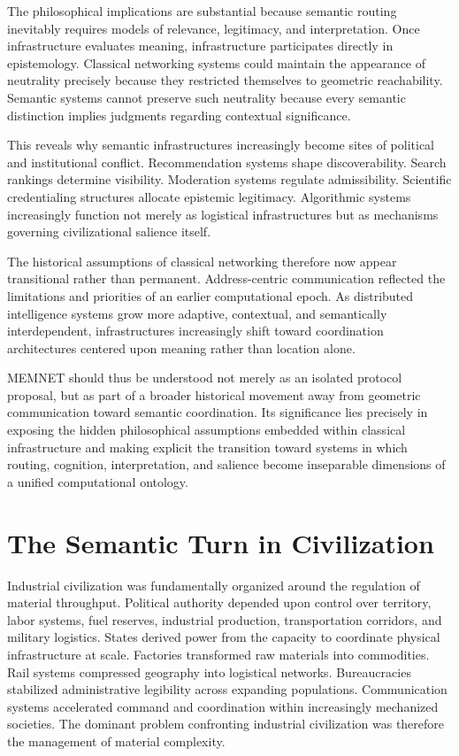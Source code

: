 \documentclass[11pt,a4paper]{article}
\begin{document}
The philosophical implications are substantial because semantic routing inevitably requires models of relevance, legitimacy, and interpretation. Once infrastructure evaluates meaning, infrastructure participates directly in epistemology. Classical networking systems could maintain the appearance of neutrality precisely because they restricted themselves to geometric reachability. Semantic systems cannot preserve such neutrality because every semantic distinction implies judgments regarding contextual significance.

This reveals why semantic infrastructures increasingly become sites of political and institutional conflict. Recommendation systems shape discoverability. Search rankings determine visibility. Moderation systems regulate admissibility. Scientific credentialing structures allocate epistemic legitimacy. Algorithmic systems increasingly function not merely as logistical infrastructures but as mechanisms governing civilizational salience itself.

The historical assumptions of classical networking therefore now appear transitional rather than permanent. Address-centric communication reflected the limitations and priorities of an earlier computational epoch. As distributed intelligence systems grow more adaptive, contextual, and semantically interdependent, infrastructures increasingly shift toward coordination architectures centered upon meaning rather than location alone.

MEMNET should thus be understood not merely as an isolated protocol proposal, but as part of a broader historical movement away from geometric communication toward semantic coordination. Its significance lies precisely in exposing the hidden philosophical assumptions embedded within classical infrastructure and making explicit the transition toward systems in which routing, cognition, interpretation, and salience become inseparable dimensions of a unified computational ontology.

\section{The Semantic Turn in Civilization}

Industrial civilization was fundamentally organized around the regulation of material throughput. Political authority depended upon control over territory, labor systems, fuel reserves, industrial production, transportation corridors, and military logistics. States derived power from the capacity to coordinate physical infrastructure at scale. Factories transformed raw materials into commodities. Rail systems compressed geography into logistical networks. Bureaucracies stabilized administrative legibility across expanding populations. Communication systems accelerated command and coordination within increasingly mechanized societies. The dominant problem confronting industrial civilization was therefore the management of material complexity.
\end{document}
